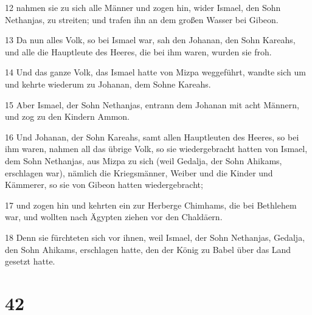 \par 12 nahmen sie zu sich alle Männer und zogen hin, wider Ismael, den Sohn Nethanjas, zu streiten; und trafen ihn an dem großen Wasser bei Gibeon.
\par 13 Da nun alles Volk, so bei Ismael war, sah den Johanan, den Sohn Kareahs, und alle die Hauptleute des Heeres, die bei ihm waren, wurden sie froh.
\par 14 Und das ganze Volk, das Ismael hatte von Mizpa weggeführt, wandte sich um und kehrte wiederum zu Johanan, dem Sohne Kareahs.
\par 15 Aber Ismael, der Sohn Nethanjas, entrann dem Johanan mit acht Männern, und zog zu den Kindern Ammon.
\par 16 Und Johanan, der Sohn Kareahs, samt allen Hauptleuten des Heeres, so bei ihm waren, nahmen all das übrige Volk, so sie wiedergebracht hatten von Ismael, dem Sohn Nethanjas, aus Mizpa zu sich (weil Gedalja, der Sohn Ahikams, erschlagen war), nämlich die Kriegsmänner, Weiber und die Kinder und Kämmerer, so sie von Gibeon hatten wiedergebracht;
\par 17 und zogen hin und kehrten ein zur Herberge Chimhams, die bei Bethlehem war, und wollten nach Ägypten ziehen vor den Chaldäern.
\par 18 Denn sie fürchteten sich vor ihnen, weil Ismael, der Sohn Nethanjas, Gedalja, den Sohn Ahikams, erschlagen hatte, den der König zu Babel über das Land gesetzt hatte.

\chapter{42}

